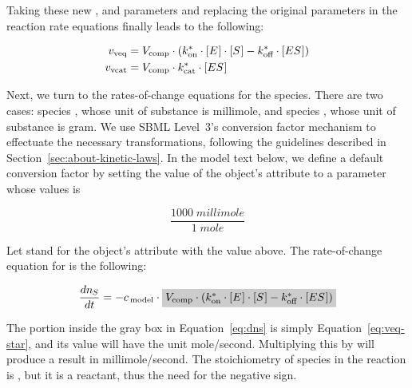 \newcommand{\nS}{\ensuremath{n_{\mkern-1muS}}\xspace}
\newcommand{\nP}{\ensuremath{n_{\mkern-1muP}}\xspace}

Taking these new \konnew, \koffnew and \kcatnew parameters and
replacing the original parameters in the reaction rate equations
finally leads to the following:
\begin{linenomath}
  \begin{align}
    \label{eq:veq-star}
    v_\text{veq}  & = V_\text{comp} \cdot (k_\text{on}^{*} \cdot [E\mkern1mu] \cdot [S\mkern1mu] - k_\text{off}^{*} \cdot [ES\mkern1mu])\\
    \label{eq:vcat-star}
    v_\text{vcat} & = V_\text{comp} \cdot k_\text{cat}^{*} \cdot [ES\mkern1mu]
  \end{align}
\end{linenomath}
Next, we turn to the rates-of-change equations for the species.
There are two cases: species , whose unit of substance
is \unit{millimole}, and species , whose unit of
substance is \unit{gram}.  We use SBML Level~3's conversion factor
mechanism to effectuate the necessary transformations, following
the guidelines described in Section~\ref{sec:about-kinetic-laws}.
In the model text below, we define a default conversion factor by
setting the value of the \Model object's 
attribute to a parameter whose values is
\begin{linenomath}
  \begin{equation*}
    \dfrac{1000 \; \unit{millimole}}{1 \; \unit{mole}}
  \end{equation*}
\end{linenomath}
Let \csg stand for the \Model object's 
attribute with the value above.  The rate-of-change equation for
 is the following:
\begin{linenomath}
  \begin{equation}\label{eq:dns}
    \dfrac{d \nS}{d t} = - \csg \cdot \colorbox{lightgray}{$\Vcomp \cdot
    (\konnew \cdot \concent{E} \cdot \concent{S} - \koffnew \cdot \concent{ES})$}
  \end{equation}
\end{linenomath}
The portion inside the gray box in Equation~\ref{eq:dns} is simply
Equation~\ref{eq:veq-star}, and its value will have the unit
mole/second.  Multiplying this by \csg will produce a result in
millimole/second.  The stoichiometry of species  in the
reaction is , but it is a reactant, thus the need for the
negative sign.

